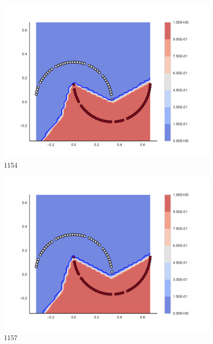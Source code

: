 \begin{subfigure}[b]{0.09\textwidth}
    \includegraphics[clip, trim=2.35cm 1.75cm 4.5cm 0cm,width=\textwidth]{img/convergence/1154.pdf}
    \caption{1154}
    \label{fig:convergence_1154}
\end{subfigure}
%
\begin{subfigure}[b]{0.09\textwidth}
    \includegraphics[clip, trim=2.35cm 1.75cm 4.5cm 0cm,width=\textwidth]{img/convergence/1157.pdf}
    \caption{1157}
    \label{fig:convergence_1157}
\end{subfigure}
%
